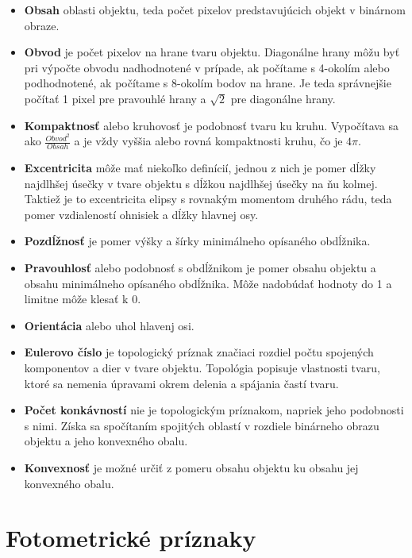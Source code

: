         \begin{itemize}
            \item \textbf{Obsah} oblasti objektu, teda počet pixelov predstavujúcich objekt v binárnom obraze.
            \item \textbf{Obvod} je počet pixelov na hrane tvaru objektu. Diagonálne hrany môžu byť pri výpočte obvodu nadhodnotené v prípade, ak počítame s 4-okolím alebo podhodnotené, ak počítame s 8-okolím bodov na hrane. Je teda správnejšie počítať 1 pixel pre pravouhlé hrany a $\sqrt{2}$ pre diagonálne hrany.
            \item \textbf{Kompaktnosť} alebo kruhovosť je podobnosť tvaru ku kruhu. Vypočítava sa ako $\frac{Obvod^2}{Obsah}$ a je vždy vyššia alebo rovná kompaktnosti kruhu, čo je $4\pi$.
            \item \textbf{Excentricita} môže mať niekoľko definícií, jednou z nich je pomer dĺžky najdlhšej úsečky v tvare objektu s dĺžkou najdlhšej úsečky na ňu kolmej. Taktiež je to excentricita elipsy s rovnakým momentom druhého rádu, teda pomer vzdialeností ohnisiek a dĺžky hlavnej osy.
            \item \textbf{Pozdĺžnosť} je pomer výšky a šírky minimálneho opísaného obdĺžnika.
            \item \textbf{Pravouhlosť} alebo podobnosť s obdĺžnikom je pomer obsahu objektu a obsahu minimálneho opísaného obdĺžnika. Môže nadobúdať hodnoty do 1 a limitne môže klesať k 0.
            \item \textbf{Orientácia} alebo uhol hlavenj osi.
            \item \textbf{Eulerovo číslo} je topologický príznak značiaci rozdiel počtu spojených komponentov a dier v tvare objektu. Topológia popisuje vlastnosti tvaru, ktoré sa nemenia úpravami okrem delenia a spájania častí tvaru.
            \item \textbf{Počet konkávností} nie je topologickým príznakom, napriek jeho podobnosti s nimi. Získa sa spočítaním spojitých oblastí v rozdiele binárneho obrazu objektu a jeho konvexného obalu.
            \item \textbf{Konvexnosť} je možné určiť z pomeru obsahu objektu ku obsahu jej konvexného obalu.
        \end{itemize}

    \section{Fotometrické príznaky}

